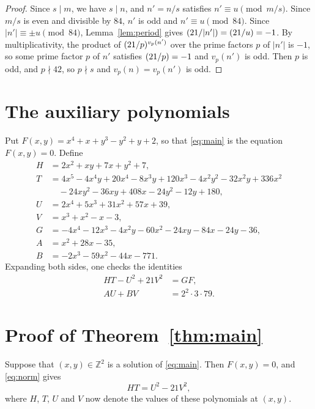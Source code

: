 \documentclass[11pt]{article}
\newcommand{\Z}{\mathbb{Z}}
\newcommand{\leg}[2]{\mathchoice{\biggl(\dfrac{#1}{#2}\biggr)}{(#1/#2)}{(#1/#2)}{(#1/#2)}}
\begin{document}
\begin{proof}
Since $s\mid m$, we have $s\mid n$, and $n'=n/s$ satisfies $n'\equiv u\pmod{m/s}$. Since $m/s$ is even and divisible by $84$, $n'$ is odd and $n'\equiv u\pmod{84}$. Since $|n'|\equiv\pm u\pmod{84}$, Lemma~\ref{lem:period} gives $\leg{21}{|n'|}=\leg{21}{u}=-1$. By multiplicativity, the product of $\leg{21}{p}^{v_p(n')}$ over the prime factors $p$ of $|n'|$ is $-1$, so some prime factor $p$ of $n'$ satisfies $\leg{21}{p}=-1$ and $v_p(n')$ is odd. Then $p$ is odd, and $p\nmid42$, so $p\nmid s$ and $v_p(n)=v_p(n')$ is odd.
\end{proof}

\section{The auxiliary polynomials}

Put $F(x,y)=x^{4}+x+y^{3}-y^{2}+y+2$, so that \eqref{eq:main} is the equation $F(x,y)=0$. Define
\begin{align*}
H&=2x^{2}+xy+7x+y^{2}+7,\\
T&=4x^{5}-4x^{4}y+20x^{4}-8x^{3}y+120x^{3}-4x^{2}y^{2}-32x^{2}y+336x^{2}\\
&\quad-24xy^{2}-36xy+408x-24y^{2}-12y+180,\\
U&=2x^{4}+5x^{3}+31x^{2}+57x+39,\\
V&=x^{3}+x^{2}-x-3,\\
G&=-4x^{4}-12x^{3}-4x^{2}y-60x^{2}-24xy-84x-24y-36,\\
A&=x^{2}+28x-35,\\
B&=-2x^{3}-59x^{2}-44x-771.
\end{align*}
Expanding both sides, one checks the identities
\begin{align}
HT-U^2+21V^2&=GF,\label{eq:norm}\\
AU+BV&=2^{2}\cdot 3\cdot 79.\label{eq:bezout}
\end{align}

\section{Proof of Theorem~\ref{thm:main}}

Suppose that $(x,y)\in\Z^2$ is a solution of \eqref{eq:main}. Then $F(x,y)=0$, and \eqref{eq:norm} gives
\begin{equation}\label{eq:HT}
HT=U^2-21V^2,
\end{equation}
where $H$, $T$, $U$ and $V$ now denote the values of these polynomials at $(x,y)$.
\end{document}
